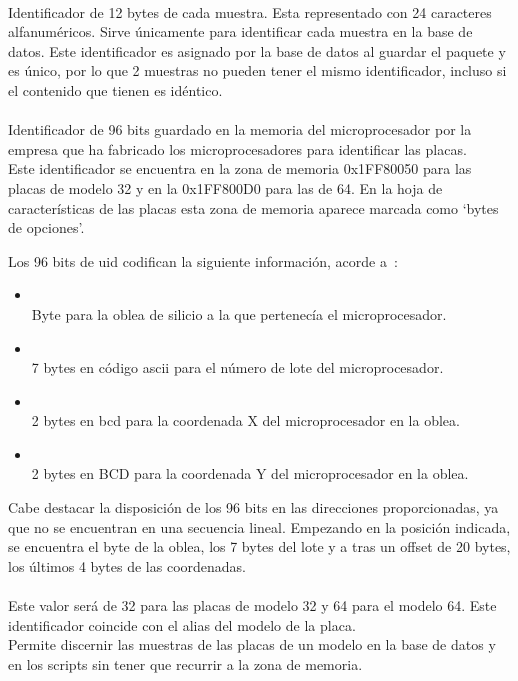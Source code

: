 \documentclass[spanish]{template/minim}
\newcommand{\dataelem}[1]{
    \noindent\textit{{\color{accent}{#1}}}
}
\begin{document}
\dataelem{ID}\\
Identificador de 12 bytes de cada muestra. Esta representado con 24 caracteres alfanuméricos. Sirve únicamente para identificar cada muestra en la base de datos. Este identificador es asignado por la base de datos al guardar el paquete y es único, por lo que 2 muestras no pueden tener el mismo identificador, incluso si el contenido que tienen es idéntico.\\

\dataelem{UID del microprocesador}\\
Identificador de 96 bits guardado en la memoria del microprocesador por la empresa que ha fabricado los microprocesadores para identificar las placas.\\

Este identificador se encuentra en la zona de memoria {\color{accent}0x1FF80050} para las placas de modelo 32 y en la {\color{accent}0x1FF800D0} para las de 64. En la hoja de características de las placas esta zona de memoria aparece marcada como `bytes de opciones'.

Los 96 bits de \gls{uid} codifican la siguiente información, acorde a~\cite{stm32_registers}:

\begin{itemize}
    \item[] \textit{\color{accent}{Oblea}}\\
        Byte para la oblea de silicio a la que pertenecía el microprocesador.
    \item[] \textit{\color{accent}{Lote}}\\
        7 bytes en código \gls{ascii} para el número de lote del microprocesador.
    \item[] \textit{\color{accent}{X}}\\
        2 bytes en \gls{bcd} para la coordenada X del microprocesador en la oblea.
    \item[] \textit{\color{accent}{Y}}\\
        2 bytes en BCD para la coordenada Y del microprocesador en la oblea.
\end{itemize}

Cabe destacar la disposición de los 96 bits en las direcciones proporcionadas, ya que no se encuentran en una secuencia lineal. Empezando en la posición indicada, se encuentra el byte de la oblea, los 7 bytes del lote y a tras un offset de 20 bytes, los últimos 4 bytes de las coordenadas.\\

\dataelem{Tipo}\\
Este valor será de 32 para las placas de modelo 32 y 64 para el modelo 64. Este identificador coincide con el alias del modelo de la placa.\\ Permite discernir las muestras de las placas de un modelo en la base de datos y en los scripts sin tener que recurrir a la zona de memoria.\\
\end{document}
